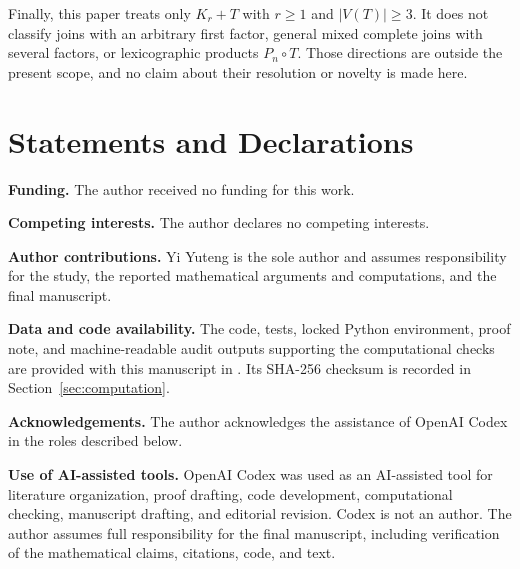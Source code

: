\documentclass[11pt,a4paper]{article}
\numberwithin{equation}{section}
\begin{document}
Finally, this paper treats only \(K_r+T\) with \(r\ge 1\) and
\(|V(T)|\ge 3\). It does not classify joins with an arbitrary first
factor, general mixed complete joins with several factors, or
lexicographic products \(P_n\circ T\). Those directions are outside the
present scope, and no claim about their resolution or novelty is made
here.

\section*{Statements and Declarations}

\noindent\textbf{Funding.}
The author received no funding for this work.

\medskip
\noindent\textbf{Competing interests.}
The author declares no competing interests.

\medskip
\noindent\textbf{Author contributions.}
Yi Yuteng is the sole author and assumes responsibility for the study, the
reported mathematical arguments and computations, and the final manuscript.

\medskip
\noindent\textbf{Data and code availability.}
The code, tests, locked Python environment, proof note, and machine-readable
audit outputs supporting the computational checks are provided with this
manuscript in . Its SHA-256 checksum
is recorded in Section~\ref{sec:computation}.

\medskip
\noindent\textbf{Acknowledgements.}
The author acknowledges the assistance of OpenAI Codex in the roles described
below.

\medskip
\noindent\textbf{Use of AI-assisted tools.}
OpenAI Codex was used as an AI-assisted tool for literature organization,
proof drafting, code development, computational checking, manuscript drafting,
and editorial revision. Codex is not an author. The author assumes full
responsibility for the final manuscript, including verification of the
mathematical claims, citations, code, and text.
\end{document}
